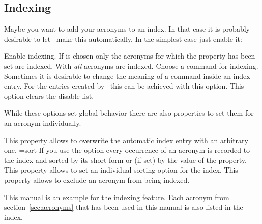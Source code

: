 \documentclass{acro-manual}
\begin{document}
\subsection{Indexing}\label{sec:indexing}
Maybe you want to add your acronyms to an index. In that case it is probably
desirable to let \acro\ make this automatically.  In the simplest case just
enable it:
\begin{options}
    Enable indexing.  If  is chosen only the
    acronyms for which the property  has been set are indexed.
    With  \emph{all} acronyms are indexed.
    Choose a command for indexing.
    Sometimes it is desirable to change the meaning of a command inside an
    index entry.  For the entries created by \acro\ this can be achieved with
    this option.
    This option clears the disable list.
\end{options}
While these options set global behavior there are also properties to set them
for an acronym individually.
\begin{properties}
  \Initial
    This property allows to overwrite the automatic index entry with an
    arbitrary one.
  \Initial={sort}
    If you use the option  every occurrence of an acronym is
    recorded to the index and sorted by its short form or (if set) by the
    value of the  property.  This property allows to set an
    individual sorting option for the index.
    This property allows to exclude an acronym from being indexed.
\end{properties}
This manual is an example for the indexing feature.  Each acronym from
section~\vref{sec:acronyms} that has been used in this manual is also listed
in the index.

\end{document}
